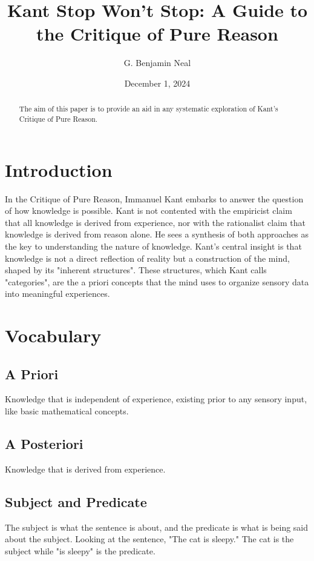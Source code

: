 \documentclass[a4paper]{article}
\begin{document}
\title{Kant Stop Won't Stop: A Guide to the Critique of Pure Reason}
\author{G. Benjamin Neal}
\date{December 1, 2024}
\maketitle

\begin{abstract}
The aim of this paper is to provide an aid in any systematic exploration of Kant's Critique of Pure Reason. 
\end{abstract}

\section{Introduction}
In the Critique of Pure Reason, Immanuel Kant embarks to answer the question of how knowledge is possible.
Kant is not contented with the empiricist claim that all knowledge is derived from experience, nor with the rationalist claim that knowledge is derived from reason alone.
He sees a synthesis of both approaches as the key to understanding the nature of knowledge.
Kant's central insight is that knowledge is not a direct reflection of reality but a construction of the mind, shaped by its "inherent structures".
These structures, which Kant calls "categories", are the a priori concepts that the mind uses to organize sensory data into meaningful experiences.

\section{Vocabulary}
\subsection{A Priori}
Knowledge that is independent of experience, existing prior to any sensory input, like basic mathematical concepts.

\subsection{A Posteriori}
Knowledge that is derived from experience.

\subsection{Subject and Predicate}
The subject is what the sentence is about, and the predicate is what is being said about the subject.
Looking at the sentence, "The cat is sleepy."
The cat is the subject while "is sleepy" is the predicate.
\end{document}

